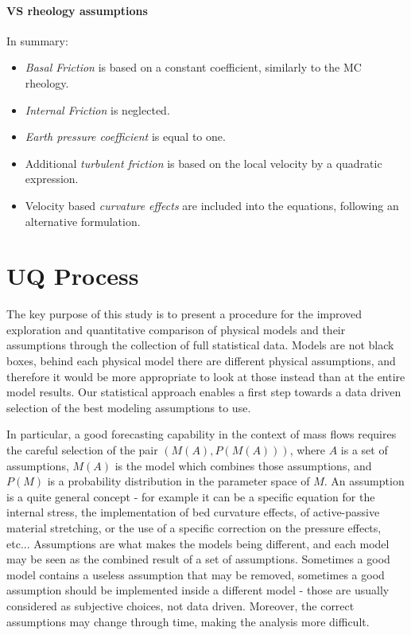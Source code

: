 \documentclass{article}
\begin{document}
\paragraph{VS rheology assumptions} In summary:
\begin{itemize}
\item \textit{Basal Friction} is based on a constant coefficient, similarly to the MC rheology.

\item \textit{Internal Friction} is neglected.

\item \textit{Earth pressure coefficient} is equal to one.

\item Additional \textit{turbulent friction} is based on the local velocity by a quadratic expression.

\item Velocity based \textit{curvature effects} are included into the equations, following an alternative formulation.
\end{itemize}


\section{UQ Process}
The key purpose of this study is to present a procedure for the improved exploration and quantitative comparison of physical models and their assumptions through the collection of full statistical data. Models are not black boxes, behind each physical model there are different physical assumptions, and therefore it would be more appropriate to look at those instead than at the entire model results. Our statistical approach enables a first step towards a data driven selection of the best modeling assumptions to use.

In particular, a good forecasting capability in the context of mass flows requires the careful selection of the pair $(M(A), P(M(A)))$, where $A$ is a set of assumptions, $M(A)$ is the model which combines those assumptions, and $P(M)$ is a probability distribution in the parameter space of $M$. An assumption is a quite general concept - for example it can be a specific equation for the internal stress, the implementation of bed curvature effects, of active-passive material stretching, or the use of a specific correction on the pressure effects, etc... Assumptions are what makes the models being different, and each model may be seen as the combined result of a set of assumptions. Sometimes a good model contains a useless assumption that may be removed, sometimes a good assumption should be implemented inside a different model - those are usually considered as subjective choices, not data driven. Moreover, the correct assumptions may change through time, making the analysis more difficult.
\end{document}
